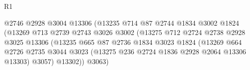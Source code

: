 \begin{lexlean}{R1}
\begin{coremodule}
                                          @2746
                                          @2928
                                          @3004
                                          @13306
                                          (@13235
                                            @714
                                            @87
                                            @2744
                                            @1834
                                            @3002
                                            @1824
                                            (@13269
                                              @713
                                              @2739
                                              @2743
                                              @3026
                                              @3002
                                              (@13275
                                                @712
                                                @2724
                                                @2738
                                                @2928
                                                @3025
                                                @13306
                                                (@13235
                                                  @665
                                                  @87
                                                  @2736
                                                  @1834
                                                  @3023
                                                  @1824
                                                  (@13269
                                                    @664
                                                    @2726
                                                    @2735
                                                    @3044
                                                    @3023
                                                    (@13275
                                                      @236
                                                      @2724
                                                      @1836
                                                      @2928
                                                      @2064
                                                      @13306
                                                      @13303)
                                                    @3057)
                                                  @13302))
                                              @3063)

\end{coremodule}
\end{lexlean}
